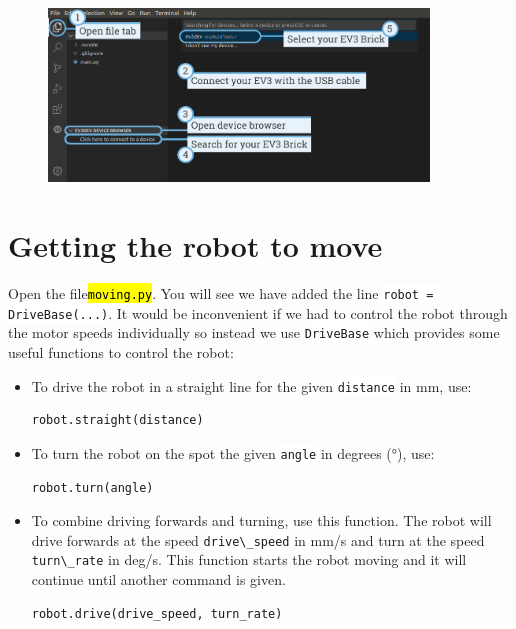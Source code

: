 \documentclass[12pt,a4paper]{article}
\newcommand{\vb}[1]{\hl{\texttt{#1}}} %
\newcommand{\code}[1]{\colorbox{background}{\lstinline{#1}}} %
\begin{document}

\begin{figure}[h]
    \centering
    \includegraphics[width=0.9\textwidth]{assets/connecting_ev3.png}
\end{figure}

\section{ Getting the robot to move}

Open the file\vb{moving.py}. You will see we have added the line \code{robot = DriveBase(...)}. 
It would be inconvenient if we had to control the robot through the motor speeds individually so instead we use \code{DriveBase} which provides some useful functions to control the robot:

\begin{itemize}
    \item To drive the robot in a straight line for the given \code{distance} in mm, use:
    \begin{lstlisting}[style=moving]
    robot.straight(distance)
    \end{lstlisting}

    \item To turn the robot on the spot the given \code{angle} in degrees (°), use:
    \begin{lstlisting}[style=moving]
    robot.turn(angle)
    \end{lstlisting}

    \item To combine driving forwards and turning, use this function. The robot will drive forwards at the speed \code{drive\_speed} in mm/s and turn at the speed \code{turn\_rate} in deg/s. This function starts the robot moving and it will continue until another command is given.
    \begin{lstlisting}[style=moving]
    robot.drive(drive_speed, turn_rate)
    \end{lstlisting}
\end{itemize}
\end{document}
